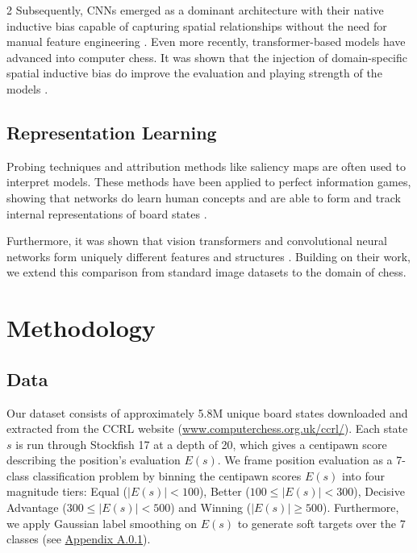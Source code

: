 \documentclass[a4paper,10pt]{article}
\begin{document}
\begin{multicols*}{2}
Subsequently, CNNs emerged as a dominant architecture with their native inductive bias capable of capturing spatial relationships without the need for manual feature engineering \cite{silver2017alphazero}. Even more recently, transformer-based models have advanced into computer chess. It was shown that the injection of domain-specific spatial inductive bias do improve the evaluation and playing strength of the models \cite{monroe2024mastering, monroe2026chessformer}.

\subsection{Representation Learning}
Probing techniques \cite{alain2016understanding} and attribution methods like saliency maps \cite{simonyan2013deep} are often used to interpret models. These methods have been applied to perfect information games, showing that networks do learn human concepts \cite{mcgrath2022acquisition} and are able to form and track internal representations of board states \cite{li2022emergent}. 

Furthermore, it was shown that vision transformers and convolutional neural networks form uniquely different features and structures \cite{raghu2021vision}. Building on their work, we extend this comparison from standard image datasets to the domain of chess.

\section{Methodology}

\subsection{Data} 
Our dataset consists of approximately 5.8M unique board states downloaded and extracted from the CCRL website (\url{www.computerchess.org.uk/ccrl/}). Each state $s$ is run through Stockfish 17 at a depth of 20, which gives a centipawn score describing the position's evaluation $E(s)$. We frame position evaluation as a 7-class classification problem by binning the centipawn scores $E(s)$ into four magnitude tiers: Equal ($|E(s)| < 100$), Better ($100 \le |E(s)| < 300$), Decisive Advantage ($300 \le |E(s)| < 500$) and Winning ($|E(s)| \ge 500$). Furthermore, we apply Gaussian label smoothing on $E(s)$ to generate soft targets over the 7 classes (see \hyperref[label_smoothing]{Appendix A.0.1}).


\end{multicols*}
\end{document}
